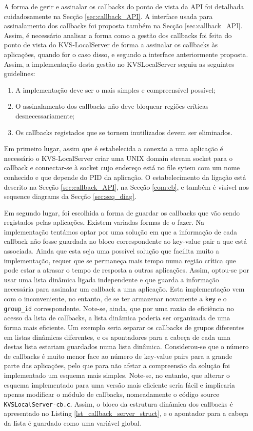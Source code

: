 A forma de gerir e assinalar os callbacks do ponto de vista da API foi detalhada cuidadosamente na Secção \ref{sec:callback_API}. A interface usada para assinalamento dos callbacks foi proposta também na Secção \ref{sec:callback_API}. Assim, é necessário analisar a forma como a gestão dos callbacks foi feita do ponto de vista do KVS-LocalServer de forma a assinalar os callbacks às aplicações, quando for o caso disso, e segundo a interface anteriormente proposta. Assim, a implementação desta gestão no KVSLocalServer seguiu as seguintes guidelines:
\begin{enumerate}[noitemsep]
    \item A implementação deve ser o mais simples e compreensível possível;
    \item O assinalamento dos callbacks não deve bloquear regiões críticas desnecessariamente;
    \item Os callbacks registados que se tornem inutilizados devem ser eliminados.
\end{enumerate}

Em primeiro lugar, assim que é estabelecida a conexão a uma aplicação é necessário o KVS-LocalServer criar uma UNIX domain stream socket para o callback e connectar-se à socket cujo endereço está no file sytem com um nome conhecido e que depende do PID da aplicação. O estabelecimento da ligação está descrito na Secção \ref{sec:callback_API}, na Secção \ref{com:cb}, e também é vísível nos sequence diagrams da Secção \ref{sec:seq_diag}.

Em segundo lugar, foi escolhida a forma de guardar os callbacks que vão sendo registados pelas aplicações. Existem variadas formas de o fazer. Na implementação tentámos optar por uma solução em que a informação de cada callback não fosse guardada no bloco correspondente ao key-value pair a que está associada. Ainda que esta seja uma possível solução que facilita muito a implementação, requer que se permaneça mais tempo numa região crítica que pode estar a atrasar o tempo de resposta a outras aplicações. Assim, optou-se por usar uma lista dinâmica ligada independente e que guarda a informação necessária para assinalar um callback a uma aplicação. Esta implementação vem com o inconveniente, no entanto, de se ter armazenar novamente a \texttt{key} e o \texttt{group\_id} correspondente. Note-se, ainda, que por uma razão de eficiência no acesso da lista de callbacks, a lista dinâmica poderia ser organizada de uma forma mais eficiente. Um exemplo seria separar os callbacks de grupos diferentes em listas dinâmicas diferentes, e os apontadores para a cabeça de cada uma destas lista estariam guardados numa lista dinâmica. Considerou-se que o número de callbacks é muito menor face ao número de key-value pairs para a grande parte das aplicações, pelo que para não afetar a compreensão da solução foi implementado um esquema mais simples. Note-se, no entanto, que alterar o esquema implementado para uma versão mais eficiente seria fácil e implicaria apenas modificar o módulo de callbacks, nomeadamente o código source \texttt{KVSLocalServer-cb.c}. Assim, o bloco da estrutura dinâmica dos callbacks é apresentado no Listing \ref{lst_callback_server_struct}, e o apontador para a cabeça da lista é guardado como uma variável global.

